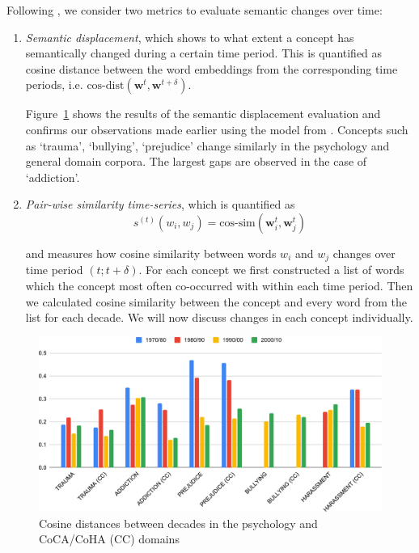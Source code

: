 \documentclass[output=paper]{langsci/langscibook}
\begin{document}
Following \citet{hamilton-etal-2016-diachronic}, we consider two metrics to evaluate semantic changes over time:

\begin{enumerate}
\item \textit{Semantic displacement}, which shows to what extent a concept has semantically changed during a certain time period. This is quantified as cosine distance between the word embeddings from the corresponding time periods, i.e. $\text{cos-dist}(\mathbf{w}^t, \mathbf{w}^{t+\delta})$.

Figure~\ref{fig:cos-dist-years} shows the results of the semantic displacement evaluation and confirms our observations made earlier using the model from \citet{sagi-etal-2009-semantic}.
Concepts such as `trauma', `bullying', `prejudice' change similarly in the psychology and general domain corpora. The largest gaps are observed in the case of `addiction'.


\item \textit{Pair-wise similarity time-series}, which is quantified as
\[ s^{(t)}(w_i,w_j)=\text{cos-sim}(\mathbf{w}^t_i,\mathbf{w}^t_j) \]

and measures how cosine similarity between words $w_i$ and $w_j$ changes over time period $(t; t+\delta)$.
For each concept we first constructed a list of words which the concept most often co-occurred with within each time period. Then we calculated cosine similarity between the concept and every word from the list for each decade. We will now discuss changes in each concept individually. 

\end{enumerate}

\begin{figure}
  \includegraphics[width=\textwidth,keepaspectratio]{figures/VYLOMOVA_distances-between-epochs-1.pdf}
\caption{Cosine distances between decades in the psychology and \mbox{CoCA/CoHA} (CC) domains}
\label{fig:cos-dist-years}
\end{figure}
\end{document}
